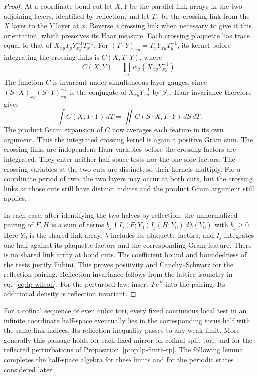 \documentclass[11pt,letterpaper,reqno]{amsart}
\numberwithin{equation}{section}
\renewcommand{\eqref}[1]{\textup{eq.~\ref{#1}}}
\theoremstyle{definition}
\theoremstyle{remark}
\begin{document}
\begin{proof}
At a coordinate bond cut let \(X,Y\) be the parallel link arrays
in the two adjoining layers, identified by reflection, and let
\(T_x\) be the crossing link from the \(X\) layer to the \(Y\)
layer at \(x\). Reverse a crossing link when necessary to give it
this orientation, which preserves its Haar measure.
Each crossing plaquette has trace equal to that of
\(X_{xy}T_yY_{xy}^{-1}T_x^{-1}\).
For \((T\cdot Y)_{xy}=T_xY_{xy}T_y^{-1}\), its kernel before
integrating the crossing links is
\(C(X,T\cdot Y)\), where
\[
 C(X,Y)=\prod_{xy}w_\beta(X_{xy}Y_{xy}^{-1}).
\]
The function \(C\) is invariant under simultaneous layer gauges,
since \((S\cdot X)_{xy}(S\cdot Y)_{xy}^{-1}\)
is the conjugate of \(X_{xy}Y_{xy}^{-1}\) by \(S_x\).
Haar invariance therefore gives
\[
 \int C(X,T\cdot Y)\,dT
       =\iint C(S\cdot X,T\cdot Y)\,dS\,dT .
\]
The product Gram expansion of \(C\) now averages each feature in
its own argument. Thus the integrated crossing kernel is again
a positive Gram sum. The crossing links are independent Haar
variables before the crossing factors are integrated. They enter
neither half-space tests nor the one-side factors. The crossing
variables at the two cuts are distinct, so their kernels multiply.
For a coordinate period of two, the two layers may occur at both
cuts, but the crossing links at those cuts still have distinct
indices and the product Gram argument still applies.

In each case, after identifying the two halves by reflection,
the unnormalized pairing of \(F,H\) is a sum of terms
\(b_j\int\overline{I_j(F;Y_0)}I_j(H;Y_0)\,d\lambda(Y_0)\)
with \(b_j\ge0\). Here \(Y_0\) is the shared link array,
\(\lambda\) includes its plaquette factors, and \(I_j\) integrates
one half against its plaquette factors and the corresponding Gram
feature. There is no shared link array at bond cuts.
The coefficient bound and boundedness of the tests justify Fubini.
This proves positivity and Cauchy--Schwarz for the reflection pairing.
Reflection invariance follows from the lattice isometry in
\eqref{eq:lp-wilson}. For the perturbed law, insert \(Fe^E\) into
the pairing. Its additional density is reflection invariant.
\end{proof}

For a cofinal sequence of even cubic tori, every fixed continuous
local test in an infinite coordinate half-space eventually lies in
the corresponding torus half with the same link indices. Its reflection
inequality passes to any weak limit. More generally this passage
holds for each fixed mirror on cofinal split tori, and for the
reflected perturbations of Proposition~\ref{prop:lp-finite-rp}.
The following lemma completes the half-space algebra for these
limits and for the periodic states considered later.
\end{document}
